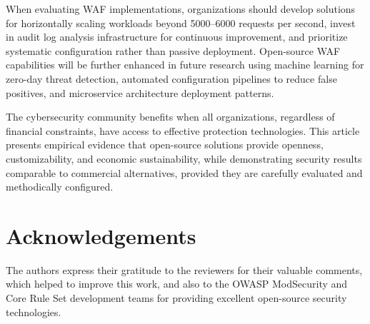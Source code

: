 \documentclass[10pt,conference]{IEEEtran}
\begin{document}
When evaluating WAF implementations, organizations should develop solutions for horizontally scaling workloads beyond 5000–6000 requests per second, invest in audit log analysis infrastructure for continuous improvement, and prioritize systematic configuration rather than passive deployment. Open-source WAF capabilities will be further enhanced in future research using machine learning for zero-day threat detection, automated configuration pipelines to reduce false positives, and microservice architecture deployment patterns.

The cybersecurity community benefits when all organizations, regardless of financial constraints, have access to effective protection technologies. This article presents empirical evidence that open-source solutions provide openness, customizability, and economic sustainability, while demonstrating security results comparable to commercial alternatives, provided they are carefully evaluated and methodically configured.

\section*{Acknowledgements}

The authors express their gratitude to the reviewers for their valuable comments, which helped to improve this work, and also to the OWASP ModSecurity and Core Rule Set development teams for providing excellent open-source security technologies.



\end{document}
